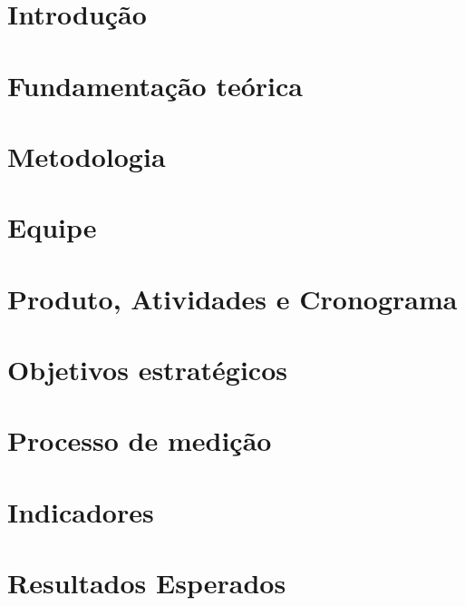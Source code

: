 
\section{Introdução} %
\label{sec:introducao}


\section{Fundamentação teórica}
\label{sec:fundamentacao_teorica}


\section{Metodologia}
\label{sec:metodologia}


\section{Equipe}
\label{sec:equipe}


\section{Produto, Atividades e Cronograma}
\label{sec:produto_atividade_cronograma}


\section{Objetivos estratégicos}
\label{sec:objetivos_estrategicos}


\section{Processo de medição}
\label{sec:processo_medicao}


\section{Indicadores}
\label{sec:indicadores}


\section{Resultados Esperados}
\label{sec:resultados_esperados}

